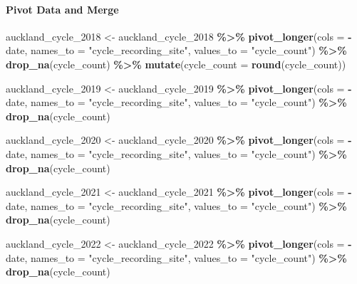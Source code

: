 \documentclass[
]{article}
\newenvironment{Shaded}{\begin{snugshade}}{\end{snugshade}}
\newcommand{\AttributeTok}[1]{\textcolor[rgb]{0.13,0.29,0.53}{#1}}
\newcommand{\FunctionTok}[1]{\textcolor[rgb]{0.13,0.29,0.53}{\textbf{#1}}}
\newcommand{\NormalTok}[1]{#1}
\newcommand{\OtherTok}[1]{\textcolor[rgb]{0.56,0.35,0.01}{#1}}
\newcommand{\SpecialCharTok}[1]{\textcolor[rgb]{0.81,0.36,0.00}{\textbf{#1}}}
\newcommand{\StringTok}[1]{\textcolor[rgb]{0.31,0.60,0.02}{#1}}
\begin{document}
\hypertarget{pivot-data-and-merge}{%
\paragraph{Pivot Data and Merge}\label{pivot-data-and-merge}}

\begin{Shaded}
\begin{Highlighting}[]
\NormalTok{auckland\_cycle\_2018 }\OtherTok{\textless{}{-}}\NormalTok{ auckland\_cycle\_2018 }\SpecialCharTok{\%\textgreater{}\%}
  \FunctionTok{pivot\_longer}\NormalTok{(}\AttributeTok{cols =} \SpecialCharTok{{-}}\NormalTok{date, }\AttributeTok{names\_to =} \StringTok{"cycle\_recording\_site"}\NormalTok{, }\AttributeTok{values\_to =} \StringTok{"cycle\_count"}\NormalTok{) }\SpecialCharTok{\%\textgreater{}\%}
  \FunctionTok{drop\_na}\NormalTok{(cycle\_count) }\SpecialCharTok{\%\textgreater{}\%}
  \FunctionTok{mutate}\NormalTok{(}\AttributeTok{cycle\_count =} \FunctionTok{round}\NormalTok{(cycle\_count))}

\NormalTok{auckland\_cycle\_2019 }\OtherTok{\textless{}{-}}\NormalTok{ auckland\_cycle\_2019 }\SpecialCharTok{\%\textgreater{}\%}
  \FunctionTok{pivot\_longer}\NormalTok{(}\AttributeTok{cols =} \SpecialCharTok{{-}}\NormalTok{date, }\AttributeTok{names\_to =} \StringTok{"cycle\_recording\_site"}\NormalTok{, }\AttributeTok{values\_to =} \StringTok{"cycle\_count"}\NormalTok{) }\SpecialCharTok{\%\textgreater{}\%}
  \FunctionTok{drop\_na}\NormalTok{(cycle\_count)}

\NormalTok{auckland\_cycle\_2020 }\OtherTok{\textless{}{-}}\NormalTok{ auckland\_cycle\_2020 }\SpecialCharTok{\%\textgreater{}\%}
  \FunctionTok{pivot\_longer}\NormalTok{(}\AttributeTok{cols =} \SpecialCharTok{{-}}\NormalTok{date, }\AttributeTok{names\_to =} \StringTok{"cycle\_recording\_site"}\NormalTok{, }\AttributeTok{values\_to =} \StringTok{"cycle\_count"}\NormalTok{) }\SpecialCharTok{\%\textgreater{}\%}
  \FunctionTok{drop\_na}\NormalTok{(cycle\_count)}

\NormalTok{auckland\_cycle\_2021 }\OtherTok{\textless{}{-}}\NormalTok{ auckland\_cycle\_2021 }\SpecialCharTok{\%\textgreater{}\%}
  \FunctionTok{pivot\_longer}\NormalTok{(}\AttributeTok{cols =} \SpecialCharTok{{-}}\NormalTok{date, }\AttributeTok{names\_to =} \StringTok{"cycle\_recording\_site"}\NormalTok{, }\AttributeTok{values\_to =} \StringTok{"cycle\_count"}\NormalTok{) }\SpecialCharTok{\%\textgreater{}\%}
  \FunctionTok{drop\_na}\NormalTok{(cycle\_count)}

\NormalTok{auckland\_cycle\_2022 }\OtherTok{\textless{}{-}}\NormalTok{ auckland\_cycle\_2022 }\SpecialCharTok{\%\textgreater{}\%}
  \FunctionTok{pivot\_longer}\NormalTok{(}\AttributeTok{cols =} \SpecialCharTok{{-}}\NormalTok{date, }\AttributeTok{names\_to =} \StringTok{"cycle\_recording\_site"}\NormalTok{, }\AttributeTok{values\_to =} \StringTok{"cycle\_count"}\NormalTok{) }\SpecialCharTok{\%\textgreater{}\%}
  \FunctionTok{drop\_na}\NormalTok{(cycle\_count)}


\end{Highlighting}
\end{Shaded}
\end{document}

